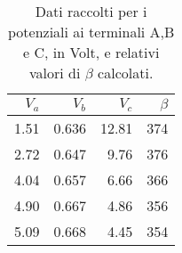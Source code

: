 \begin{table}[h]\caption{Dati raccolti per i potenziali ai terminali A,B e
    C, in Volt, e relativi valori di $\beta$ calcolati.}
    \centering
    \begin{tabular}{*4r}
$V_a$ & $V_b$ & $V_c$ & $\beta$ \\\hline
1.51 & 0.636 & 12.81 & 374\\
2.72 & 0.647 & 9.76 & 376\\
4.04 & 0.657 & 6.66 & 366\\
4.90 & 0.667 & 4.86 & 356\\
5.09 & 0.668 & 4.45 & 354\\
\end{tabular}
    \end{table}
